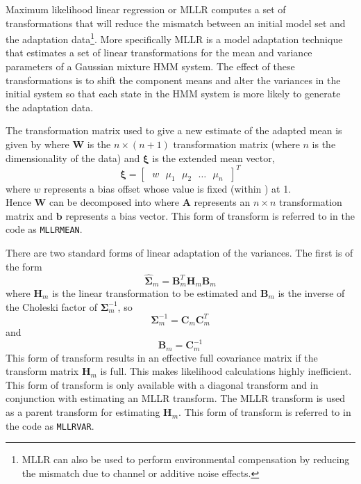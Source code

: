 
Maximum likelihood linear regression or MLLR
computes a set of transformations that will reduce the mismatch
between an initial model set and the adaptation data\footnote{
MLLR can also be used to perform environmental compensation by
reducing the mismatch due to channel or additive noise effects.}.
More specifically MLLR is a model adaptation technique
that estimates a set of linear transformations for the mean and
variance parameters of a Gaussian mixture HMM system. 
The effect of these transformations is to shift the
component means and alter the variances in the initial system 
so that each state in the HMM system is more likely to generate the 
adaptation data.

The transformation matrix used to give a new estimate of the adapted mean is
given by
where $\bm{W}$ is the $n \times \left( n + 1 \right)$
transformation matrix (where $n$ is the dimensionality of the data)
and $\bm{\xi}$ is the extended mean vector,
\[
        \bm{\xi} = \left[\mbox{ }w\mbox{ }\mu_1\mbox{ }\mu_2\mbox{ }\dots\mbox{ }\mu_n\mbox{ }\right]^T
\]
where $w$ represents a bias offset whose value is fixed (within \HTK) at 1.\\
Hence $\bm{W}$ can be decomposed into
where $\bm{A}$ represents an $n \times n$
transformation matrix and $\bm{b}$ represents a bias vector. This
form of transform is referred to in the code as {\tt MLLRMEAN}.


There are two standard forms of linear adaptation of the variances. The first
is of the form
\[
        \hat{\bm{\Sigma}}_{m} = \bm{B}_m^T\bm{H}_m\bm{B}_m
\]
where $\bm{H}_m$ is the linear transformation to be estimated and
$\bm{B}_m$ is the inverse of the Choleski factor of $\bm{\Sigma}_{m}^{-1}$,
so
\[ 
        \bm{\Sigma}_{m}^{-1} = \bm{C}_m\bm{C}_m^T
\]
and
\[
        \bm{B}_m = \bm{C}_m^{-1}
\]
This form of transform results in an effective full covariance matrix if
the transform matrix $\bm{H}_m$ is full. This makes likelihood calculations
highly inefficient. This form of transform is only available with a 
diagonal transform and in conjunction with estimating an MLLR transform. The
MLLR transform is used as a parent transform for estimating $\bm{H}_m$.
This form of transform is referred to in the code as {\tt MLLRVAR}.

